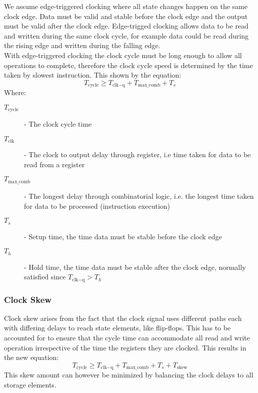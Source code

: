 \documentclass[12pt letter]{report}
\begin{document}

We assume edge-triggered clocking where all state changes happen on the same clock edge. Data must be valid and stable before the clock edge and the output must be valid after the clock edge. Edge-trigged clocking allows data to be read and written during the same clock cycle, for example data could be read during the
rising edge and written during the falling edge. \\

With edge-triggered clocking the clock cycle must be long enough to allow all operations to complete, therefore the clock cycle speed is determined by
the time taken by slowest instruction. This shown by the equation:
\[
  T_{\text{cycle}} \geq T_{\text{clk} - \text{q}} + T_{\text{max\_comb}} + T_s
\]
Where:
\begin{description}
  \item[$T_{\text{cycle}}$] - The clock cycle time
  \item[$T_{\text{clk}}$] - The clock to output delay through register, i.e time taken for data to be read from a register
  \item[$T_{\text{max\_comb}}$] - The longest delay through combinatorial logic, i.e. the longest time taken for data to be processed (instruction execution)
  \item [$T_s$] - Setup time, the time data must be stable before the clock edge
  \item [$T_h$] - Hold time, the time data must be stable after the clock edge, normally satisfied since $T_{\text{clk} - \text{q}} > T_h$
\end{description}

\subsubsection{Clock Skew}


Clock skew arises from the fact that the clock signal uses different paths each with differing delays to reach state elements, like flip-flops. This
has to be accounted for to ensure that the cycle time can accommodate all read and write operation irrespective of the time the registers they are clocked.
This results in the new equation:
\[
  T_{\text{cycle}} \geq T_{\text{clk} - \text{q}} + T_{\text{max\_comb}} + T_s + T_{\text{skew}}
\]
This skew amount can however be minimized by balancing the clock delays to all storage elements.
\end{document}
